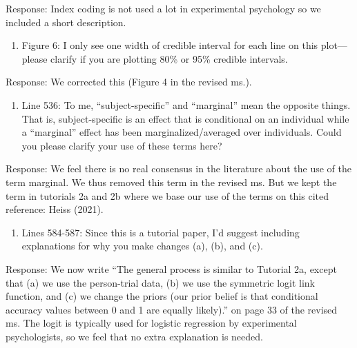 \documentclass[
]{article}
\providecommand{\tightlist}{%
  \setlength{\itemsep}{0pt}\setlength{\parskip}{0pt}}
\renewenvironment{quote}{\begin{leftbar}}{\end{leftbar}}
\begin{document}
Response: Index coding is not used a lot in experimental psychology so
we included a short description.

\begin{quote}
\begin{enumerate}
\def\labelenumi{\arabic{enumi}.}
\setcounter{enumi}{11}
\tightlist
\item
  Figure 6: I only see one width of credible interval for each line on
  this plot--- please clarify if you are plotting 80\% or 95\% credible
  intervals.
\end{enumerate}
\end{quote}

Response: We corrected this (Figure 4 in the revised ms.).

\begin{quote}
\begin{enumerate}
\def\labelenumi{\arabic{enumi}.}
\setcounter{enumi}{12}
\tightlist
\item
  Line 536: To me, ``subject-specific'' and ``marginal'' mean the
  opposite things. That is, subject-specific is an effect that is
  conditional on an individual while a ``marginal'' effect has been
  marginalized/averaged over individuals. Could you please clarify your
  use of these terms here?
\end{enumerate}
\end{quote}

Response: We feel there is no real consensus in the literature about the
use of the term marginal. We thus removed this term in the revised ms.
But we kept the term in tutorials 2a and 2b where we base our use of the
terms on this cited reference: Heiss (2021).

\begin{quote}
\begin{enumerate}
\def\labelenumi{\arabic{enumi}.}
\setcounter{enumi}{13}
\tightlist
\item
  Lines 584-587: Since this is a tutorial paper, I'd suggest including
  explanations for why you make changes (a), (b), and (c).
\end{enumerate}
\end{quote}

Response: We now write ``The general process is similar to Tutorial 2a,
except that (a) we use the person-trial data, (b) we use the symmetric
logit link function, and (c) we change the priors (our prior belief is
that conditional accuracy values between 0 and 1 are equally likely).''
on page 33 of the revised ms. The logit is typically used for logistic
regression by experimental psychologists, so we feel that no extra
explanation is needed.
\end{document}
